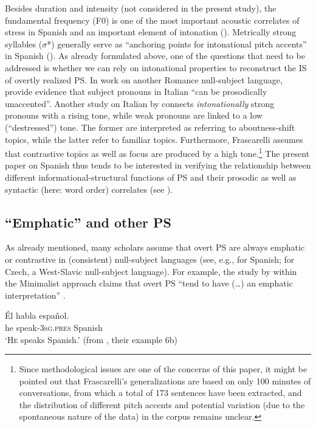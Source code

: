 \documentclass[output=paper]{langsci/langscibook}
\begin{document}
Besides duration and intensity (not considered in the present study), the fundamental frequency (F0) is one of the most important acoustic correlates of stress in Spanish and an important element of intonation (\citealt[239--246]{Hualde2005}). Metrically strong syllables ($\sigma $*) generally serve as ``anchoring points for intonational pitch accents'' in Spanish (\citealt[358]{Hualde2015}). As already formulated above, one of the questions that need to be addressed is whether we can rely on intonational properties to reconstruct the IS of overtly realized PS. In work on another Romance null-subject language, \citet[58]{Cardinaletti1999} provide evidence that subject pronouns in Italian ``can be prosodically unaccented''. Another study on Italian by \citet[695]{Frascarelli2007} connects \textit{intonationally} strong pronouns with a rising tone, while weak pronouns are linked to a low (``destressed'') tone. The former are interpreted as referring to aboutness-shift topics, while the latter refer to familiar topics. Furthermore, Frascarelli assumes that contrastive topics as well as focus are produced by a high tone.\footnote{Since methodological issues are one of the concerns of this paper, it might be pointed out that Frascarelli’s generalizations are based on only 100 minutes of conversations, from which a total of 173 sentences have been extracted, and the distribution of different pitch accents and potential variation (due to the spontaneous nature of the data) in the corpus remains unclear.}\textsuperscript{} The present paper on Spanish thus tends to be interested in verifying the relationship between different informational-structural functions of PS and their prosodic as well as syntactic (here: word order) correlates (see ).

\subsection{``Emphatic'' and other PS}
\label{sec:pes:2.2}
As already mentioned, many scholars assume that overt PS are always emphatic or contrastive in (consistent) null-subject languages (see, e.g., \citealt[1311-1312]{Lujan1999} for Spanish; \citealt[199]{Fehrmann2008} for Czech, a West-Slavic null-subject language). For example, the study by \citet[7]{Biberauer2010} within the Minimalist approach claims that overt PS ``tend to have (…) an emphatic interpretation'' .

\ea\label{ex:pes:3}
\gll Él    habla      espa{\~n}ol.\\
       he    speak-\textsc{3sg}.\textsc{pres} Spanish\\
\glt ‘\textsc{He} speaks Spanish.’    (from \citealt[7]{Biberauer2010}, their example 6b)
\z
\end{document}
